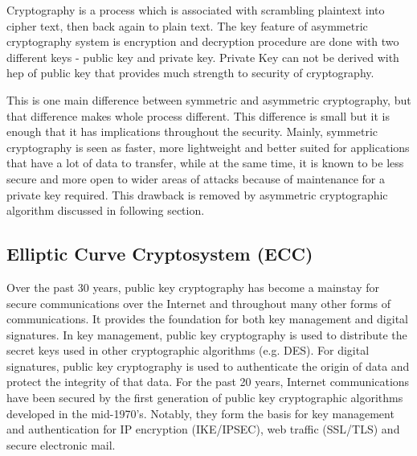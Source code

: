 \documentclass[conference]{IEEEtran}
\begin{document}


Cryptography is a process which is associated with scrambling plaintext into cipher text, then back again to plain text. The key feature of asymmetric cryptography system is encryption and decryption procedure are done with two different keys - public key and private key. Private Key can not be derived with hep of public key that provides much strength to security of cryptography.

This is one main difference between symmetric and asymmetric cryptography, but that difference makes whole process different. This difference is small but it is enough that it has implications throughout the security. Mainly, symmetric cryptography is seen as faster, more lightweight and better suited for applications that have a lot of data to transfer, while at the same time, it is known to be less secure and more open to wider areas of attacks because of maintenance for a private key required. This drawback is removed by asymmetric cryptographic algorithm discussed in following section.

\subsection{{\large Elliptic Curve Cryptosystem (ECC)\cite{ecc}}}
Over the past 30 years, public key cryptography has become a mainstay for secure communications over the Internet and throughout many other forms of communications. It provides the foundation for both key management and digital signatures. In key management, public key cryptography is used to distribute the secret keys used in other cryptographic algorithms (e.g. DES). For digital signatures, public key cryptography is used to authenticate the origin of data and protect the integrity of that data. For the past 20 years, Internet communications have been secured by the first generation of public key cryptographic algorithms developed in the mid-1970's. Notably, they form the basis for key management and authentication for IP encryption (IKE/IPSEC), web traffic (SSL/TLS) and secure electronic mail. 
\end{document}
